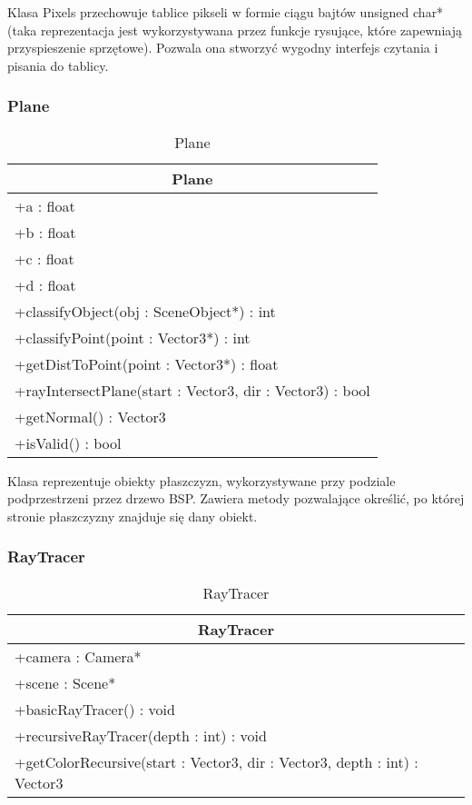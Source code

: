 Klasa Pixels przechowuje tablice pikseli w formie ciągu bajtów unsigned char* (taka reprezentacja jest wykorzystywana przez funkcje rysujące, które zapewniają przyspieszenie sprzętowe). Pozwala ona stworzyć wygodny interfejs czytania i pisania do tablicy. 

\subsubsection{Plane}

\footnotesize
\begin{longtable}{|p{14cm}|}
    \caption{Plane} \label{tab:Plane} \\ \hline
    \multicolumn{1}{|c|}{Plane} \\ \hline
    +a : float \\ 
    +b : float \\
    +c : float \\
    +d : float \\
    \hline
	+classifyObject(obj : SceneObject*) : int \\
	+classifyPoint(point : Vector3*) : int \\
	+getDistToPoint(point : Vector3*) : float \\
	+rayIntersectPlane(start : Vector3, dir : Vector3) : bool \\
	+getNormal() : Vector3 \\
	+isValid() : bool \\
	\hline
\end{longtable}
\normalsize

Klasa reprezentuje obiekty płaszczyzn, wykorzystywane przy podziale podprzestrzeni przez drzewo BSP. Zawiera metody pozwalające określić, po której stronie płaszczyzny znajduje się dany obiekt.

\subsubsection{RayTracer}

\footnotesize
\begin{longtable}{|p{14cm}|}
    \caption{RayTracer} \label{tab:RayTracer} \\ \hline
    \multicolumn{1}{|c|}{RayTracer} \\ \hline
    +camera : Camera* \\
    +scene : Scene* \\ \hline
	+basicRayTracer() : void \\
	+recursiveRayTracer(depth : int) : void \\
	+getColorRecursive(start : Vector3, dir : Vector3, depth : int) : Vector3 \\
	\hline
\end{longtable}
\normalsize

